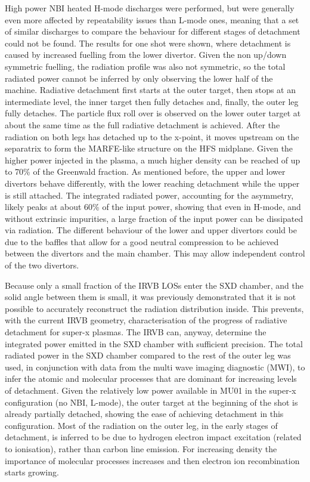 High power NBI heated H-mode discharges were performed, but were generally even more affected by repeatability issues than L-mode ones, meaning that a set of similar discharges to compare the behaviour for different stages of detachment could not be found. The results for one shot were shown, where detachment is caused by increased fuelling from the lower divertor. Given the non up/down symmetric fuelling, the radiation profile was also not symmetric, so the total radiated power cannot be inferred by only observing the lower half of the machine. Radiative detachment first starts at the outer target, then stops at an intermediate level, the inner target then fully detaches and, finally, the outer leg fully detaches. The particle flux roll over is observed on the lower outer target at about the same time as the full radiative detachment is achieved. After the radiation on both legs has detached up to the x-point, it moves upstream on the separatrix to form the MARFE-like structure on the HFS midplane. Given the higher power injected in the plasma, a much higher density can be reached of up to 70\% of the Greenwald fraction. As mentioned before, the upper and lower divertors behave differently, with the lower reaching detachment while the upper is still attached. The integrated radiated power, accounting for the asymmetry, likely peaks at about 60\% of the input power, showing that even in H-mode, and without extrinsic impurities, a large fraction of the input power can be dissipated via radiation. The different behaviour of the lower and upper divertors could be due to the baffles that allow for a good neutral compression to be achieved between the divertors and the main chamber. This may allow independent control of the two divertors.

Because only a small fraction of the IRVB LOSs enter the SXD chamber, and the solid angle between them is small, it was previously demonstrated that it is not possible to accurately reconstruct the radiation distribution inside. This prevents, with the current IRVB geometry, characterisation of the progress of radiative detachment for super-x plasmas. The IRVB can, anyway, determine the integrated power emitted in the SXD chamber with sufficient precision. The total radiated power in the SXD chamber compared to the rest of the outer leg was used, in conjunction with data from the multi wave imaging diagnostic (MWI), to infer the atomic and molecular processes that are dominant for increasing levels of detachment. Given the relatively low power available in MU01 in the super-x configuration (no NBI, L-mode), the outer target at the beginning of the shot is already partially detached, showing the ease of achieving detachment in this configuration. Most of the radiation on the outer leg, in the early stages of detachment, is inferred to be due to hydrogen electron impact excitation (related to ionisation), rather than carbon line emission. For increasing density the importance of molecular processes increases and then electron ion recombination starts growing.


